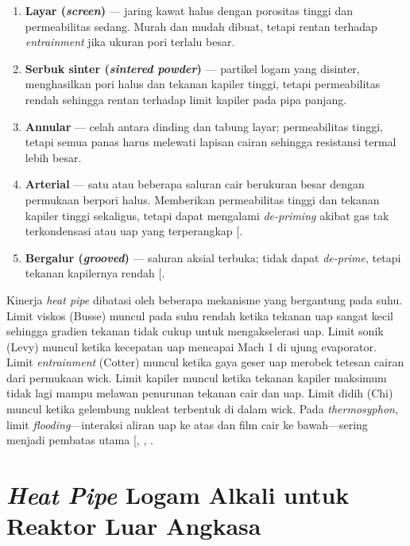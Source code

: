 \documentclass[
  indonesian,
  12pt,
  a4paper,
]{report}
\providecommand{\tightlist}{%
  \setlength{\itemsep}{0pt}\setlength{\parskip}{0pt}}
\begin{document}
\begin{enumerate}
\def\labelenumi{\arabic{enumi}.}
\tightlist
\item
  \textbf{Layar (\emph{screen})} --- jaring kawat halus dengan porositas
  tinggi dan permeabilitas sedang. Murah dan mudah dibuat, tetapi rentan
  terhadap \emph{entrainment} jika ukuran pori terlalu besar.
\item
  \textbf{Serbuk sinter (\emph{sintered powder})} --- partikel logam
  yang disinter, menghasilkan pori halus dan tekanan kapiler tinggi,
  tetapi permeabilitas rendah sehingga rentan terhadap limit kapiler
  pada pipa panjang.
\item
  \textbf{Annular} --- celah antara dinding dan tabung layar;
  permeabilitas tinggi, tetapi semua panas harus melewati lapisan cairan
  sehingga resistansi termal lebih besar.
\item
  \textbf{Arterial} --- satu atau beberapa saluran cair berukuran besar
  dengan permukaan berpori halus. Memberikan permeabilitas tinggi dan
  tekanan kapiler tinggi sekaligus, tetapi dapat mengalami
  \emph{de-priming} akibat gas tak terkondensasi atau uap yang
  terperangkap {[}\citeproc{ref-walker2013}{12}{]}.
\item
  \textbf{Bergalur (\emph{grooved})} --- saluran aksial terbuka; tidak
  dapat \emph{de-prime}, tetapi tekanan kapilernya rendah
  {[}\citeproc{ref-walker2013}{12}{]}.
\end{enumerate}

Kinerja \emph{heat pipe} dibatasi oleh beberapa mekanisme yang
bergantung pada suhu. Limit viskos (Busse) muncul pada suhu rendah
ketika tekanan uap sangat kecil sehingga gradien tekanan tidak cukup
untuk mengakselerasi uap. Limit sonik (Levy) muncul ketika kecepatan uap
mencapai Mach 1 di ujung evaporator. Limit \emph{entrainment} (Cotter)
muncul ketika gaya geser uap merobek tetesan cairan dari permukaan wick.
Limit kapiler muncul ketika tekanan kapiler maksimum tidak lagi mampu
melawan penurunan tekanan cair dan uap. Limit didih (Chi) muncul ketika
gelembung nukleat terbentuk di dalam wick. Pada \emph{thermosyphon},
limit \emph{flooding}---interaksi aliran uap ke atas dan film cair ke
bawah---sering menjadi pembatas utama {[},
, \citeproc{ref-tien1979}{14}{]}.

\section{\texorpdfstring{\emph{Heat Pipe} Logam Alkali untuk Reaktor
Luar
Angkasa}{Heat Pipe Logam Alkali untuk Reaktor Luar Angkasa}}\label{heat-pipe-logam-alkali-untuk-reaktor-luar-angkasa}
\end{document}
